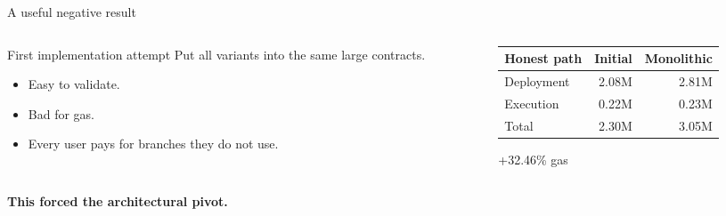 \documentclass[aspectratio=169,10pt]{beamer}
\begin{document}
\begin{frame}{A useful negative result}
  \begin{columns}[T,onlytextwidth]
    \begin{column}{0.50\textwidth}
      \begin{block}{First implementation attempt}
        Put all variants into the same large contracts.
      \end{block}
      \begin{itemize}
        \item Easy to validate.
        \item Bad for gas.
        \item Every user pays for branches they do not use.
      \end{itemize}
    \end{column}
    \begin{column}{0.46\textwidth}
      \begin{center}
        \begin{tabular}{lrr}
          \toprule
          Honest path & Initial & Monolithic \\
          \midrule
          Deployment & 2.08M & 2.81M \\
          Execution & 0.22M & 0.23M \\
          \midrule
          Total & 2.30M & 3.05M \\
          \bottomrule
        \end{tabular}
      \end{center}
      \vspace{0.5em}
      \centering
      \alert{+32.46\% gas}
    \end{column}
  \end{columns}
  \vfill
  \centering
  \Large \textbf{This forced the architectural pivot.}
\end{frame}
\end{document}
